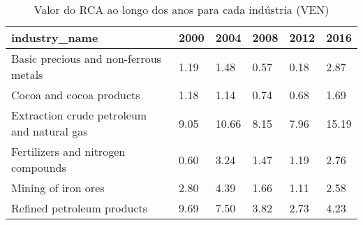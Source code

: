 \begin{table}
\centering
\caption{Valor do RCA ao longo dos anos para cada indústria (VEN)}
\begin{tabular}{p{6cm}p{1.5cm}p{1.5cm}p{1.5cm}p{1.5cm}p{1.5cm}}
\toprule
                             industry\_name & 2000 &  2004 & 2008 & 2012 &  2016 \\
\midrule
     Basic precious and non-ferrous metals & 1.19 &  1.48 & 0.57 & 0.18 &  2.87 \\
                  Cocoa and cocoa products & 1.18 &  1.14 & 0.74 & 0.68 &  1.69 \\
Extraction crude petroleum and natural gas & 9.05 & 10.66 & 8.15 & 7.96 & 15.19 \\
        Fertilizers and nitrogen compounds & 0.60 &  3.24 & 1.47 & 1.19 &  2.76 \\
                       Mining of iron ores & 2.80 &  4.39 & 1.66 & 1.11 &  2.58 \\
                Refined petroleum products & 9.69 &  7.50 & 3.82 & 2.73 &  4.23 \\
\bottomrule
\end{tabular}
\end{table}
